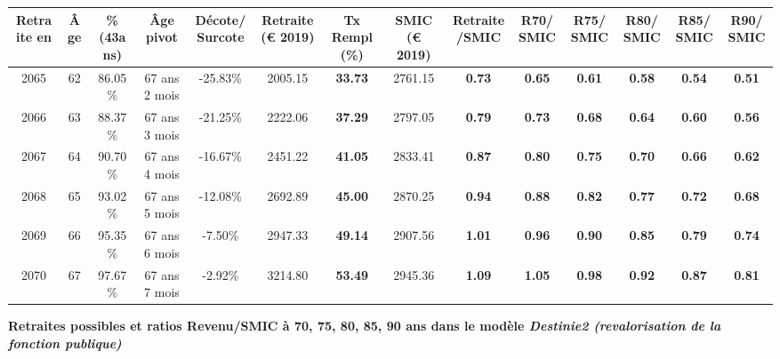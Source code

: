 \begin{adjustbox}{max width=\textwidth} 
\begin{tabular}[htb]{|c|c||c|c|c||c|c||c|c||c|c|c|c|c|} 
\hline 
 Retraite en &  Âge &  \%(43ans) &  Âge pivot &  Décote/Surcote &  Retraite (\euro{} 2019) &  Tx Rempl(\%) &  SMIC (\euro{} 2019) &  Retraite/SMIC &  R70/SMIC &  R75/SMIC &  R80/SMIC &  R85/SMIC &  R90/SMIC \\ 
\hline \hline 
 2065 &  62 &  86.05\% &  67 ans 2 mois &  -25.83\% &  2005.15 &  {\bf 33.73} &  2761.15 &  {\bf {\color{red} 0.73}} &  {\bf {\color{red} 0.65}} &  {\bf {\color{red} 0.61}} &  {\bf {\color{red} 0.58}} &  {\bf {\color{red} 0.54}} &  {\bf {\color{red} 0.51}} \\ 
\hline 
 2066 &  63 &  88.37\% &  67 ans 3 mois &  -21.25\% &  2222.06 &  {\bf 37.29} &  2797.05 &  {\bf {\color{red} 0.79}} &  {\bf {\color{red} 0.73}} &  {\bf {\color{red} 0.68}} &  {\bf {\color{red} 0.64}} &  {\bf {\color{red} 0.60}} &  {\bf {\color{red} 0.56}} \\ 
\hline 
 2067 &  64 &  90.70\% &  67 ans 4 mois &  -16.67\% &  2451.22 &  {\bf 41.05} &  2833.41 &  {\bf {\color{red} 0.87}} &  {\bf {\color{red} 0.80}} &  {\bf {\color{red} 0.75}} &  {\bf {\color{red} 0.70}} &  {\bf {\color{red} 0.66}} &  {\bf {\color{red} 0.62}} \\ 
\hline 
 2068 &  65 &  93.02\% &  67 ans 5 mois &  -12.08\% &  2692.89 &  {\bf 45.00} &  2870.25 &  {\bf {\color{red} 0.94}} &  {\bf {\color{red} 0.88}} &  {\bf {\color{red} 0.82}} &  {\bf {\color{red} 0.77}} &  {\bf {\color{red} 0.72}} &  {\bf {\color{red} 0.68}} \\ 
\hline 
 2069 &  66 &  95.35\% &  67 ans 6 mois &  -7.50\% &  2947.33 &  {\bf 49.14} &  2907.56 &  {\bf 1.01} &  {\bf {\color{red} 0.96}} &  {\bf {\color{red} 0.90}} &  {\bf {\color{red} 0.85}} &  {\bf {\color{red} 0.79}} &  {\bf {\color{red} 0.74}} \\ 
\hline 
 2070 &  67 &  97.67\% &  67 ans 7 mois &  -2.92\% &  3214.80 &  {\bf 53.49} &  2945.36 &  {\bf 1.09} &  {\bf 1.05} &  {\bf {\color{red} 0.98}} &  {\bf {\color{red} 0.92}} &  {\bf {\color{red} 0.87}} &  {\bf {\color{red} 0.81}} \\ 
\hline 
\hline 
\end{tabular} 
\end{adjustbox} 
 
 \vspace{0.1cm} 
{\bf \noindent Retraites possibles et ratios Revenu/SMIC à 70, 75, 80, 85, 90 ans dans le modèle \emph{Destinie2 (revalorisation de la fonction publique)}}  
 
